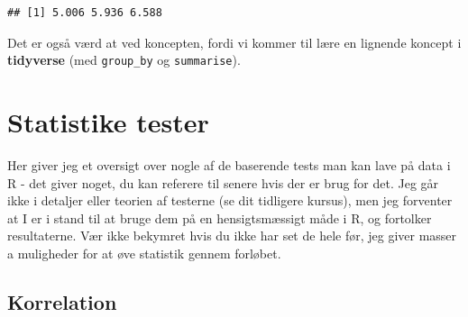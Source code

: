 \documentclass[
]{book}
\newenvironment{Shaded}{\begin{snugshade}}{\end{snugshade}}
\newcommand{\CommentTok}[1]{\textcolor[rgb]{0.56,0.35,0.01}{\textit{#1}}}
\newcommand{\FunctionTok}[1]{\textcolor[rgb]{0.00,0.00,0.00}{#1}}
\newcommand{\NormalTok}[1]{#1}
\newcommand{\OtherTok}[1]{\textcolor[rgb]{0.56,0.35,0.01}{#1}}
\newcommand{\SpecialCharTok}[1]{\textcolor[rgb]{0.00,0.00,0.00}{#1}}
\newcommand{\StringTok}[1]{\textcolor[rgb]{0.31,0.60,0.02}{#1}}
\begin{document}
\begin{Shaded}
\end{Shaded}

\begin{verbatim}
## [1] 5.006 5.936 6.588
\end{verbatim}

Det er også værd at ved koncepten, fordi vi kommer til lære en lignende koncept i \textbf{tidyverse} (med \texttt{group\_by} og \texttt{summarise}).

\hypertarget{statistike-tester}{%
\section{Statistike tester}\label{statistike-tester}}

Her giver jeg et oversigt over nogle af de baserende tests man kan lave på data i R - det giver noget, du kan referere til senere hvis der er brug for det. Jeg går ikke i detaljer eller teorien af testerne (se dit tidligere kursus), men jeg forventer at I er i stand til at bruge dem på en hensigtsmæssigt måde i R, og fortolker resultaterne. Vær ikke bekymret hvis du ikke har set de hele før, jeg giver masser a muligheder for at øve statistik gennem forløbet.

\hypertarget{korrelation}{%
\subsection{Korrelation}\label{korrelation}}
\end{document}
